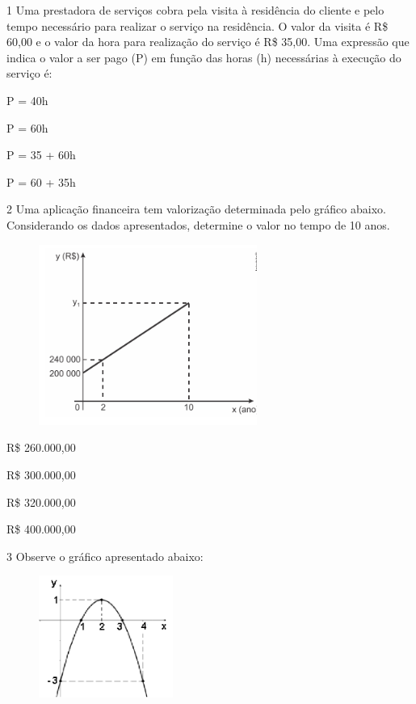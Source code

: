 \begin{escolha}
\begin{escolha}
\num{1} Uma prestadora de serviços cobra pela visita à residência do
cliente e pelo tempo necessário para realizar o serviço na residência. O
valor da visita é R\$ 60,00 e o valor da hora para realização do serviço é
R\$ 35,00. Uma expressão que indica o valor a ser pago (P) em função das
horas (h) necessárias à execução do serviço é:

\begin{escolha}
  \item P = 40h

  \item P = 60h

  \item P = 35 + 60h

  \item P = 60 + 35h
\end{escolha}

\num{2} Uma aplicação financeira tem valorização determinada pelo gráfico abaixo.
Considerando os dados apresentados, determine o valor no tempo de 10 anos.

\begin{figure}
\centering
\includegraphics[width=2.80858in,height=2.3252in]{./_SAEB_9_MAT/media/image155.png}
\end{figure}

\begin{escolha}
\item R\$ 260.000,00

\item R\$ 300.000,00

\item R\$ 320.000,00

\item R\$ 400.000,00
\end{escolha}

\num{3} Observe o gráfico apresentado abaixo:

\begin{figure}
\centering
\includegraphics[width=1.72515in,height=1.5668in]{./_SAEB_9_MAT/media/image156.png}
\end{figure}


\end{escolha}
\end{escolha}
